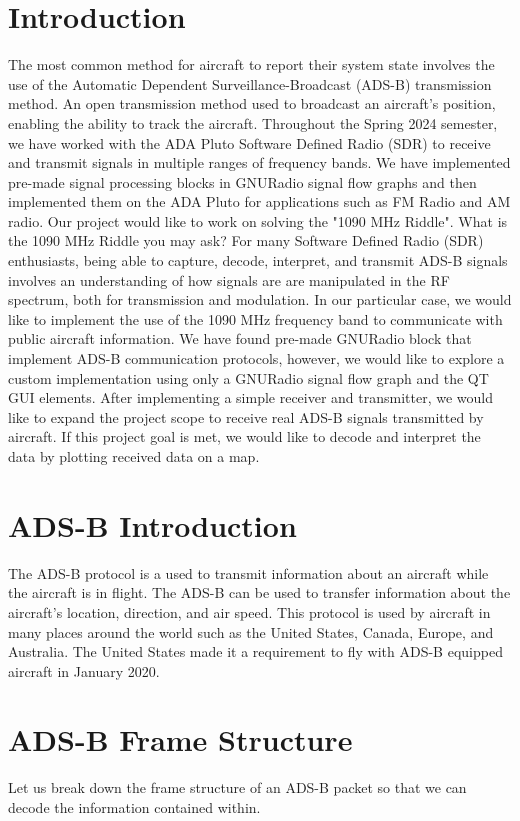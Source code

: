 \documentclass[conference, onecolumn]{IEEEtran}
\begin{document}
\section{Introduction}
The most common method for aircraft to report their system state involves the use of the Automatic Dependent Surveillance-Broadcast (ADS-B) transmission method. An open transmission method used to broadcast an aircraft's position, enabling the ability to track the aircraft. Throughout the Spring 2024 semester, we have worked with the ADA Pluto Software Defined Radio (SDR) to receive and transmit signals in multiple ranges of frequency bands. We have implemented pre-made signal processing blocks in GNURadio signal flow graphs and then implemented them on the ADA Pluto for applications such as FM Radio and AM radio. Our project would like to work on solving the "1090 MHz Riddle". What is the 1090 MHz Riddle you may ask? For many Software Defined Radio (SDR) enthusiasts, being able to capture, decode, interpret, and transmit ADS-B signals involves an understanding of how signals are are manipulated in the RF spectrum, both for transmission and modulation. In our particular case, we would like to implement the use of the 1090 MHz frequency band to communicate with public aircraft information. We have found pre-made GNURadio block that implement ADS-B communication protocols, however, we would like to explore a custom implementation using only a GNURadio signal flow graph and the QT GUI elements. After implementing a simple receiver and transmitter, we would like to expand the project scope to receive real ADS-B signals transmitted by aircraft. If this project goal is met, we would like to decode and interpret the data by plotting received data on a map.

\section{ADS-B Introduction}
The ADS-B protocol is a used to transmit information about an aircraft while the aircraft is in flight. The ADS-B can be used to transfer information about the aircraft's location, direction, and air speed. This protocol is used by aircraft in many places around the world such as the United States, Canada, Europe, and Australia. The United States made it a requirement to fly with ADS-B equipped aircraft in January 2020. 

\section{ADS-B Frame Structure}
Let us break down the frame structure of an ADS-B packet so that we can decode the information contained within. 
\end{document}
